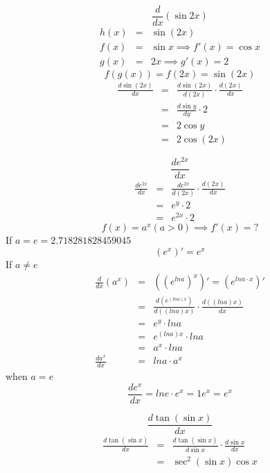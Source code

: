 \begin{eg}
$$\displaystyle \frac{d}{dx} (\sin 2x)$$
$$\begin{array}{rcl}
h(x) & = & \sin (2x)\\
f(x) & = & \sin x \implies f'(x) = \cos x\\
g(x) & = & 2x \implies g'(x) = 2
\end{array}$$
$$f(g(x)) = f(2x) = \sin (2x)$$
$$\begin{array}{rcl}
\displaystyle \frac{d \sin (2x)}{dx} & = & \displaystyle \frac{d \sin (2x)}{d(2x)} \cdot \frac{d(2x)}{dx}\\
& = & \displaystyle \frac{d \sin y}{dy} \cdot 2\\
& = & \displaystyle 2\cos y \\
& = & 2\cos (2x)
\end{array}$$
\end{eg}
\begin{eg}
$$\displaystyle \frac{de^{2x}}{dx}$$
$$\begin{array}{rcl}
\displaystyle \frac{de^{2x}}{dx} & = & \displaystyle \frac{de^{2x}}{d(2x)} \cdot \frac{d(2x)}{dx}\\
& = & \displaystyle e^y \cdot 2\\
& = & e^{2x} \cdot 2
\end{array}$$
$$f(x) = a^x (a>0) \implies f'(x) = ?$$
If $a = e = 2.718281828459045$\\
$$(e^x)' = e^x$$
If $a \neq e$\\
$$\begin{array}{rcl}
\displaystyle \frac{d}{dx} (a^x) & = & ((e^{ln a})^x)' = (e^{ln a \cdot x})'\\
& = & \displaystyle \frac{d(e^{(ln a)x})}{d((ln a)x)} \cdot \frac{d((ln a)x)}{dx}\\
& = & e^y \cdot ln a\\
& = & e^{(ln a)x} \cdot ln a\\
& = & a^x \cdot ln a\\
\displaystyle \frac{d a^x}{dx} & = & ln a\cdot a^x
\end{array}$$
when $a = e$\\
$$\displaystyle \frac{de^x}{dx} = ln e \cdot e^x = 1 e^x= e^x$$
\end{eg}
\begin{eg}
$$\displaystyle \frac{d \tan (\sin x)}{dx}$$
$$\begin{array}{rcl}
\displaystyle \frac{d \tan (\sin x)}{dx} & = & \displaystyle \frac{d \tan (\sin x)}{d \sin x} \cdot \frac{d \sin x}{dx}\\
& = & \sec ^2 (\sin x) \cos x
\end{array}$$
\end{eg}
